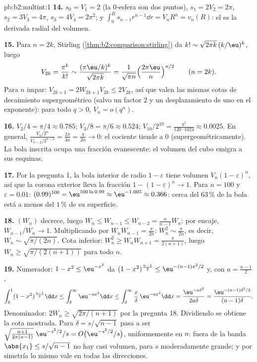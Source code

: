 \begin{solution}{pb:b2:multint:1}
\textbf{14.} $s_0 = V_1 = 2$ (la $0$-esfera son dos puntos), $s_1 =
2V_2 = 2\pi$, $s_2 = 3V_3 = 4\pi$, $s_3 = 4V_4 = 2\pi^2$; y
$\int_0^R s_{n-1}r^{n-1}\dd r = V_nR^n = v_n(R)$: el  es la
derivada radial del volumen.

\textbf{15.} Para $n = 2k$, Stirling
(\cref{thm:b2:comparison:stirling}) da $k! \sim \sqrt{2\pi
k}\,(k/\eu)^k$, luego
\[
V_{2k} = \frac{\pi^k}{k!}
\sim \frac{(\pi\eu/k)^k}{\sqrt{2\pi k}}
= \frac1{\sqrt{\pi n}}\Bigl(\frac{2\pi\eu}n\Bigr)^{n/2}
\qquad (n = 2k).
\]
Para $n$ impar: $V_{2k+1} = 2W_{2k+1}V_{2k} \leq 2V_{2k}$, así que
valen las mismas cotas de decaimiento supergeométrico (salvo un
factor $2$ y un desplazamiento de uno en el exponente): para todo $q
> 0$, $V_n = o(q^n)$.

\textbf{16.} $V_2/4 = \pi/4 \approx 0.785$; $V_3/8 = \pi/6 \approx
0.524$; $V_{10}/2^{10} = \frac{\pi^5}{120\cdot1024} \approx 0.0025$.
En general, $\frac{V_n/2^n}{V_{n-2}/2^{n-2}} = \frac{2\pi}{4n} =
\frac{\pi}{2n} \to 0$: el cociente tiende a $0$
(supergeométricamente). La bola inscrita ocupa una fracción
evanescente: el volumen del cubo emigra a sus esquinas.

\textbf{17.} Por la pregunta 1, la bola interior de radio $1 -
\varepsilon$ tiene volumen $V_n(1-\varepsilon)^n$, así que la corona
exterior lleva la fracción $1 - (1 - \varepsilon)^n \to 1$. Para $n =
100$ y $\varepsilon = 0.01$: $(0.99)^{100} = \eu^{100\ln0.99} \approx
\eu^{-1.005} \approx 0.366$: cerca del $63\,\%$ de la bola está a
menos del $1\,\%$ de su superficie.

\textbf{18.} $(W_n)$ decrece, luego $W_n \leq W_{n-1} \leq W_{n-2} =
\frac{n}{n-1}W_n$: por encaje, $W_{n-1}/W_n \to 1$. Multiplicando por
$W_nW_{n-1} = \frac\pi{2n}$: $W_n^2 \sim \frac\pi{2n}$, es decir,
$W_n \sim \sqrt{\pi/(2n)}$. Cota inferior: $W_n^2 \geq W_nW_{n+1} =
\frac{\pi}{2(n+1)}$, luego $W_n \geq \sqrt{\pi/(2(n+1))}$ para todo
$n$.

\textbf{19.} Numerador: $1 - x^2 \leq \eu^{-x^2}$ da $(1 -
x^2)^{\frac{n-1}2} \leq \eu^{-(n-1)x^2/2}$ y, con $a = \frac{n-1}2$,
\[
\int_\delta^1(1 - x^2)^{\frac{n-1}2}\dd x
\leq \int_\delta^\infty\eu^{-ax^2}\dd x
\leq \int_\delta^\infty\frac x\delta\,\eu^{-ax^2}\dd x
= \frac{\eu^{-a\delta^2}}{2a\delta}
= \frac{\eu^{-(n-1)\delta^2/2}}{(n-1)\delta}.
\]
Denominador: $2W_n \geq \sqrt{2\pi/(n+1)}$ por la pregunta 18.
Dividiendo se obtiene la cota mostrada. Para $\delta =
s/\sqrt{n-1}$ pasa a ser
$\sqrt{\tfrac{n+1}{2\pi(n-1)}}\;\eu^{-s^2/2}/s = O\bigl(
\eu^{-s^2/2}/s\bigr)$, uniformemente en $n$: fuera de la banda
$\abs{x_1} \leq s/\sqrt{n-1}$ no hay casi volumen, para $s$
moderadamente grande; y por simetría lo mismo vale en todas las
direcciones.


\end{solution}
